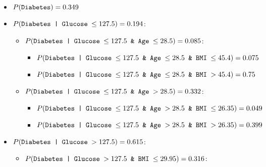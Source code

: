 \documentclass[12pt]{article}
\begin{document}
\begin{enumerate}[leftmargin=\labelsep, label=\textbf{\arabic*.)}]
\begin{enumerate}[label=\textbf{\roman*.)},leftmargin=0em]
                    \begin{itemize}
                        \item $P( \text{\texttt{Diabetes}}) = 0.349$
                    \end{itemize}
                    \begin{itemize}
                        \item $P( \text{\texttt{Diabetes | Glucose $\leq 127.5$}}) = 0.194$:
                              \begin{itemize}
                                  \item $P( \text{\texttt{Diabetes | Glucose $\leq 127.5$ \& Age $\leq 28.5$}}) = 0.085$:
                                        \begin{itemize}
                                            \item $P( \text{\texttt{Diabetes | Glucose $\leq 127.5$ \& Age $\leq 28.5$ \& BMI $\leq 45.4$}}) = 0.075$
                                            \item $P( \text{\texttt{Diabetes | Glucose $\leq 127.5$ \& Age $\leq 28.5$ \& BMI $> 45.4$}}) = 0.75$
                                        \end{itemize}
                                  \item $P( \text{\texttt{Diabetes | Glucose $\leq 127.5$ \& Age $> 28.5$}}) = 0.332$:
                                        \begin{itemize}
                                            \item $P( \text{\texttt{Diabetes | Glucose $\leq 127.5$ \& Age $> 28.5$ \& BMI $\leq 26.35$}}) = 0.049$
                                            \item $P( \text{\texttt{Diabetes | Glucose $\leq 127.5$ \& Age $> 28.5$ \& BMI $> 26.35$}}) = 0.399$
                                        \end{itemize}
                              \end{itemize}
                    \end{itemize}
                    \begin{itemize}
                        \item $P( \text{\texttt{Diabetes | Glucose $> 127.5$}}) = 0.615$:
                              \begin{itemize}
                                  \item $P( \text{\texttt{Diabetes | Glucose $> 127.5$ \& BMI $\leq 29.95$}}) = 0.316$:

\end{itemize}
\end{itemize}
\end{enumerate}
\end{enumerate}
\end{document}
